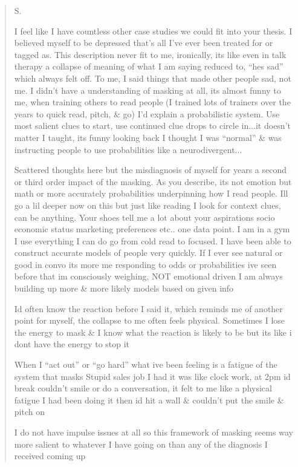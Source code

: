 \begin{quote}
\noindent\textsc{S.}
\par\smallskip\noindent I feel like I have countless other case studies we could fit into your thesis. I believed myself to be depressed that's all I've ever been treated for or tagged as. This description never fit to me, ironically, its like even in talk therapy a collapse of meaning of what I am saying reduced to, ``hes sad'' which always felt off. To me, I said things that made other people sad, not me. I didn't have a understanding of masking at all, its almost funny to me, when training others to read people (I trained lots of trainers over the years to quick read, pitch, \& go) I'd explain a probabilistic system. Use most salient clues to start, use continued clue drops to circle in...it doesn't matter I taught, its funny looking back I thought I was ``normal'' \& was instructing people to use probabilities like a neurodivergent...
\par\smallskip\noindent Scattered thoughts here but the misdiagnosis of myself for years a second or third order impact of the masking. As you describe, its not emotion but math or more accurately probabilities underpinning how I read people. Ill go a lil deeper now on this but just like reading I look for context clues, can be anything. Your shoes tell me a lot about your aspirations socio economic status marketing preferences etc.. one data point. I am in a gym I use everything I can do go from cold read to focused. I have been able to construct accurate models of people very quickly. If I ever see natural or good in convo its more me responding to odds or probabilities ive seen before that im consciously weighing, NOT emotional driven I am always building up more \& more likely models based on given info
\par\smallskip\noindent Id often know the reaction before I said it, which reminds me of another point for myself, the collapse to me often feels physical. Sometimes I lose the energy to mask \& I know what the reaction is likely to be but its like i dont have the energy to stop it
\par\smallskip\noindent When I ``act out'' or ``go hard'' what ive been feeling is a fatigue of the system that masks Stupid sales job I had it was like clock work, at 2pm id break couldn't smile or do a conversation, it felt to me like a physical fatigue I had been doing it then id hit a wall \& couldn't put the smile \& pitch on
\par\smallskip\noindent I do not have impulse issues at all so this framework of masking seems way more salient to whatever I have going on than any of the diagnosis I received coming up

\end{quote}

